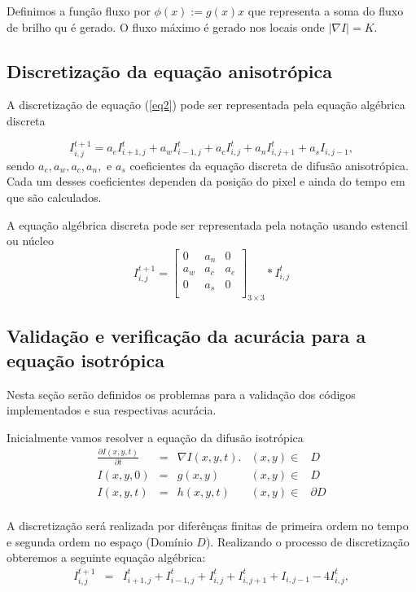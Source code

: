 \documentclass[a4paper]{article} %
\begin{document}
Definimos a função fluxo por $\phi(x):=g(x)x$ que representa a soma do fluxo de brilho qu é gerado. O fluxo máximo é gerado nos locais onde $|\nabla I|=K$.

\subsection{Discretização da equação anisotrópica}
A discretização de equação (\ref{eq2}) pode ser representada pela equação algébrica discreta

\begin{equation}\label{eq6}
 I_{i,j}^{t+1} = a_eI_{i+1,j}^{t}+a_wI_{i-1,j}^{t}+a_cI_{i,j}^{t}+a_nI_{i,j+1}^{t}+a_sI_{i,j-1},
\end{equation}
sendo $a_e,a_w,a_c,a_n,$ e $a_s$ coeficientes da equação discreta de difusão anisotrópica. Cada um desses coeficientes dependen da posição do pixel e ainda do tempo em que são calculados.  

A equação algébrica discreta pode ser representada pela notação usando estencil ou núcleo
$$I_{i,j}^{t+1}=\left[
\begin{array}{lrl}
 0 &  a_n & 0\\
 a_w &  a_c & a_e\\
 0 &  a_s & 0\\
\end{array}
\right]_{3 \times 3}*I_{i,j}^{t}$$

\subsection{Validação e verificação da acurácia para a equação isotrópica}

Nesta seção serão definidos os problemas para a validação dos códigos implementados e sua respectivas acurácia.

Inicialmente vamos resolver a equação da difusão isotrópica
\begin{equation}
\begin{array}{lllll}
	\frac{\partial I(x,y,t)}{\partial t}&=&\nabla I(x,y,t). &(x,y)\in&D\\ 
	I(x,y,0)& = & g(x,y) & (x,y)\in & D\\
	I(x,y,t)& = & h(x,y,t) & (x,y)\in&\partial D\\
\end{array}\label{equa1:1}
\end{equation}

A discretização será realizada por diferênças finitas de primeira ordem no tempo e segunda ordem no espaço (Domínio $D$). Realizando o processo de discretização obteremos a seguinte equação algébrica:
\begin{equation}
\begin{array}{lll}
	I_{i,j}^{t+1} &=& I_{i+1,j}^{t}+I_{i-1,j}^{t}+I_{i,j}^{t}+I_{i,j+1}^{t}+I_{i,j-1}-4I_{i,j}^t,\label{equa1:2}
\end{array}\label{equa1:2}
\end{equation}
\end{document}
